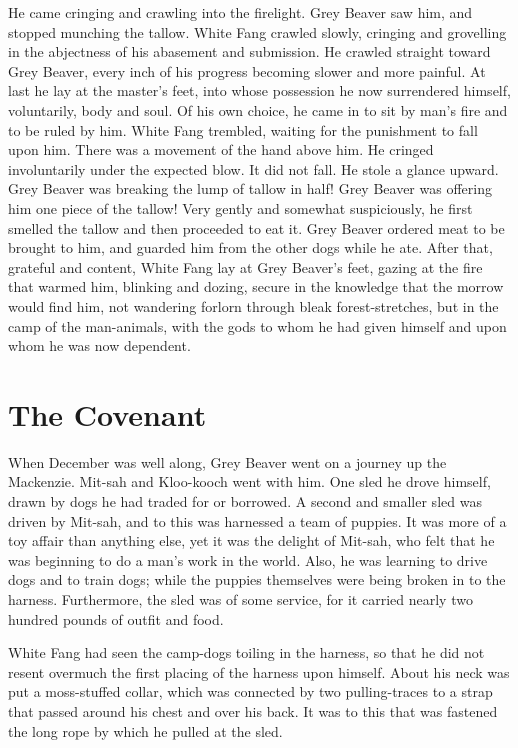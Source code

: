 \documentclass[10pt]{book}
\begin{document}
He came cringing and crawling into the firelight. Grey Beaver saw him,
and stopped munching the tallow. White Fang crawled slowly, cringing
and grovelling in the abjectness of his abasement and submission. He
crawled straight toward Grey Beaver, every inch of his progress
becoming slower and more painful. At last he lay at the master’s feet,
into whose possession he now surrendered himself, voluntarily, body and
soul. Of his own choice, he came in to sit by man’s fire and to be
ruled by him. White Fang trembled, waiting for the punishment to fall
upon him. There was a movement of the hand above him. He cringed
involuntarily under the expected blow. It did not fall. He stole a
glance upward. Grey Beaver was breaking the lump of tallow in half!
Grey Beaver was offering him one piece of the tallow! Very gently and
somewhat suspiciously, he first smelled the tallow and then proceeded
to eat it. Grey Beaver ordered meat to be brought to him, and guarded
him from the other dogs while he ate. After that, grateful and content,
White Fang lay at Grey Beaver’s feet, gazing at the fire that warmed
him, blinking and dozing, secure in the knowledge that the morrow would
find him, not wandering forlorn through bleak forest-stretches, but in
the camp of the man-animals, with the gods to whom he had given himself
and upon whom he was now dependent.

\chapter{The Covenant}

When December was well along, Grey Beaver went on a journey up the
Mackenzie. Mit-sah and Kloo-kooch went with him. One sled he drove
himself, drawn by dogs he had traded for or borrowed. A second and
smaller sled was driven by Mit-sah, and to this was harnessed a team of
puppies. It was more of a toy affair than anything else, yet it was the
delight of Mit-sah, who felt that he was beginning to do a man’s work
in the world. Also, he was learning to drive dogs and to train dogs;
while the puppies themselves were being broken in to the harness.
Furthermore, the sled was of some service, for it carried nearly two
hundred pounds of outfit and food.

White Fang had seen the camp-dogs toiling in the harness, so that he
did not resent overmuch the first placing of the harness upon himself.
About his neck was put a moss-stuffed collar, which was connected by
two pulling-traces to a strap that passed around his chest and over his
back. It was to this that was fastened the long rope by which he pulled
at the sled.
\end{document}
